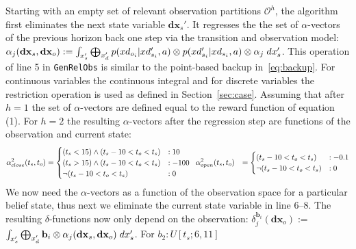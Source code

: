\documentclass{article} %
\renewcommand{\vec}[1]{\mathbf{#1}} %
\newcommand{\xds}{\mathbf{dx}_s}
\newcommand{\xdo}{\mathbf{dx}_o}
\begin{document}
Starting with an empty set of
relevant observation partitions $\mathcal{O}^h$, the algorithm first
eliminates the next state variable $\xds'$. It regresses the
the set of
$\alpha$-vectors of the previous horizon back one step via
the transition and observation model: $\alpha_j(\xds,\xdo) :=
\int_{x_s'} \bigoplus_{x_d'} p(xd_{o_i}|xd'_{s_i},a)  \otimes  p(xd'_{s_i}| xd_{s_i},a) \otimes  \alpha_j\hspace{1mm}dx_s'
$.  This operation of line 5 in \texttt{GenRelObs} is similar to 
the point-based backup in~\eqref{eq:backup}. For
continuous variables the continuous integral and for discrete
variables the restriction operation is used as defined in
Section~\ref{sec:case}.  
Assuming that after $h=1$ the set of $\alpha$-vectors are
defined equal to the reward function of equation (1).
For $h=2$ the resulting $\alpha$-vectors after the regression step are functions of the observation and current state: 
{\footnotesize
\vspace{-2mm}
\begin{align}
\alpha_{close}^2(t_s,t_o) &= 
\begin{cases}
 (t_s<15)\wedge (t_s - 10 < t_o<t_s) &: 10 \\
(t_s>15)\wedge (t_s - 10 < t_o<t_s) &: -100  \\
\neg(t_s - 10 < t_o<t_s) &: 0
\end{cases}
\hspace{2mm} 
\alpha_{open}^2(t_s,t_o) &= \begin{cases}
(t_s - 10 < t_o<t_s) &: -0.1 \\
\neg(t_s - 10 < t_o<t_s) &: 0
\end{cases}
\nonumber
\end{align}
} 
We now need the $\alpha$-vectors as a function of the observation
space for a particular belief state, thus next we eliminate the
current state variable in line 6--8. The resulting $\delta$-functions
now only depend on the observation: $\delta_{j}^{\vec{b}_i}(\xdo) := $
$\int_{x_s'} \bigoplus_{x_d'} \vec{b}_i  \otimes  \alpha_j(\xds,\xdo) \hspace{1mm}dx_s'$.  For $b_2: U[t_s;6,11]$
\end{document}
